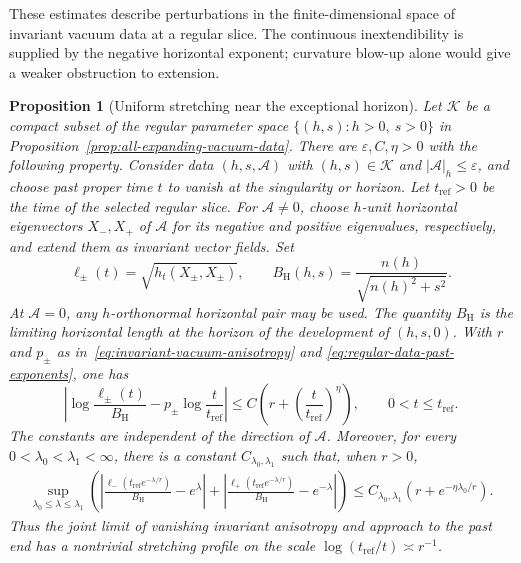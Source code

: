 \documentclass[10pt,a4paper]{article}
\numberwithin{equation}{section}
\newtheorem{proposition}[theorem]{Proposition}
\theoremstyle{definition}
\theoremstyle{remark}
\begin{document}
These estimates describe perturbations in the finite-dimensional space
of invariant vacuum data at a regular slice.  The continuous
inextendibility is supplied by the negative horizontal exponent;
curvature blow-up alone would give a weaker obstruction to extension.

\begin{proposition}[Uniform stretching near the exceptional horizon]
\label{prop:uniform-vacuum-horizon}
Let $\mathcal K$ be a compact subset of the regular parameter space
$\{(h,s):h>0,\ s>0\}$ in
Proposition~\ref{prop:all-expanding-vacuum-data}.
There are $\varepsilon,C,\eta>0$ with the following property.
Consider data $(h,s,\mathcal A)$ with $(h,s)\in\mathcal K$ and
$|\mathcal A|_h\le\varepsilon$, and choose past proper time $t$ to
vanish at the singularity or horizon.  Let $t_{\mathrm{ref}}>0$ be
the time of the selected regular slice.  For $\mathcal A\ne0$, choose
$h$-unit horizontal eigenvectors $X_-,X_+$ of $\mathcal A$ for its
negative and positive eigenvalues, respectively, and extend them as
invariant vector fields.  Set
\[
 \ell_\pm(t)=\sqrt{h_t(X_\pm,X_\pm)},\qquad
 B_{\mathrm H}(h,s)=\frac{n(h)}{\sqrt{n(h)^2+s^2}}.
\]
At $\mathcal A=0$, any $h$-orthonormal horizontal pair may be used.
The quantity $B_{\mathrm H}$ is the limiting horizontal length at
the horizon of the development of $(h,s,0)$.  With $r$ and $p_\pm$
as in~\eqref{eq:invariant-vacuum-anisotropy} and
\eqref{eq:regular-data-past-exponents}, one has
\begin{equation}
 \left|\log\frac{\ell_\pm(t)}{B_{\mathrm H}}
       -p_\pm\log\frac{t}{t_{\mathrm{ref}}}\right|
 \le C\left(r+\left(\frac{t}{t_{\mathrm{ref}}}\right)^\eta\right),
 \qquad 0<t\le t_{\mathrm{ref}}.
 \label{eq:uniform-horizon-stretching}
\end{equation}
The constants are independent of the direction of $\mathcal A$.
Moreover, for every $0<\lambda_0<\lambda_1<\infty$, there is a
constant $C_{\lambda_0,\lambda_1}$ such that, when $r>0$,
\begin{align}
 \sup_{\lambda_0\le\lambda\le\lambda_1}
 \left(
 \left|\frac{\ell_-(t_{\mathrm{ref}}e^{-\lambda/r})}
                  {B_{\mathrm H}}-e^\lambda\right|
 +\left|\frac{\ell_+(t_{\mathrm{ref}}e^{-\lambda/r})}
                  {B_{\mathrm H}}-e^{-\lambda}\right|
 \right)
 \le C_{\lambda_0,\lambda_1}
       \left(r+e^{-\eta\lambda_0/r}\right).
 \label{eq:uniform-horizon-crossover}
\end{align}
Thus the joint limit of vanishing invariant anisotropy and approach
to the past end has a nontrivial stretching profile on the scale
$\log(t_{\mathrm{ref}}/t)\asymp r^{-1}$.
\end{proposition}
\end{document}
